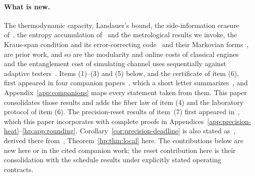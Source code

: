 \paragraph{What is new.} The thermodynamic capacity, Landauer's bound, the side-information erasure of~\cite{delRio11}, the entropy accumulation of~\cite{DFR20} and the metrological results we invoke, the Kraus-span condition and its error-correcting code~\cite{ZhouJiang21} and their Markovian forms~\cite{ZhouZhangPreskillJiang18,DemkowiczCzajkowskiSekatski17}, are prior work, and so are the modularity and online costs of classical engines~\cite{BMC18,LoomisCrutchfield20,Thompson25} and the entanglement cost of simulating channel uses sequentially against adaptive testers~\cite{Wilde18}. Items (1)--(3) and (5) below, and the certificate of item (6), first appeared in four companion papers~\cite{Order,SaveWork,Answering,KeepingTime}, which a short letter summarizes~\cite{Letter}, and Appendix~\ref{app:companions} maps every statement taken from them. This paper consolidates those results and adds the fiber law of item (4) and the laboratory protocol of item (6). The precision-reset results of item~(7) first appeared in~\cite{HPheat}, which this paper incorporates with complete proofs in Appendices~\ref{app:precision-heat}--\ref{hp:app:rounding}. Corollary~\ref{cor:precision-deadline} is also stated as~\cite[Corollary~13.1]{HPuncomputable}, derived there from~\cite[Theorem~2.1]{HPheat}, Theorem~\ref{hp:thm:local} here. The contributions below are new here or in the cited companion work; the reset contribution here is their consolidation with the schedule results under explicitly stated operating contracts.
